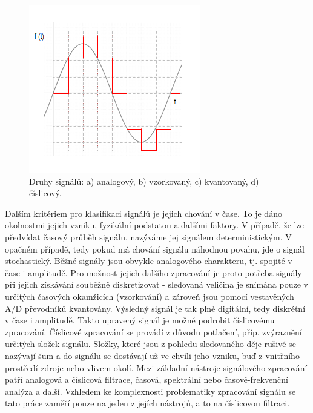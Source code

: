 \documentclass[a4paper, 12pt]{article}
\begin{document}
\begin{figure}[ht!]
\begin{minipage}[b]{5cm}
   \subcaption{}
\end{minipage}\hspace{1cm}
\begin{minipage}[b]{5cm}
  \centering
  \includegraphics[width=\linewidth]{číslicový.png}
  \subcaption{}
\end{minipage}
\caption{Druhy signálů: a) analogový, b) vzorkovaný, c) kvantovaný, d) číslicový.}
\label{fig:signal}
\end{figure}


Dalším kritériem pro klasifikaci signálů je jejich chování v čase. To je dáno okolnostmi jejich vzniku, fyzikální podstatou a dalšími faktory. V případě, že lze předvídat časový průběh signálu, nazýváme jej signálem deterministickým. V opačném případě, tedy pokud má chování signálu náhodnou povahu, jde o signál stochastický.
Běžné signály jsou obvykle analogového charakteru, tj. spojité v čase i amplitudě. Pro možnost jejich dalšího zpracování je proto potřeba signály při jejich získávání souběžně diskretizovat - sledovaná veličina je snímána pouze v určitých časových okamžicích (vzorkování) a zároveň jsou pomocí vestavěných A/D převodníků kvantovány. Výsledný signál je tak plně digitální, tedy diskrétní v čase i amplitudě. Takto upravený signál je možné podrobit číslicovému zpracování.
Číslicové zpracování se provádí z důvodu potlačení, příp. zvýraznění určitých složek signálu. Složky, které jsou z pohledu sledovaného děje rušivé se nazývají šum a do signálu se dostávají už ve chvíli jeho vzniku, buď z vnitřního prostředí zdroje nebo vlivem okolí. Mezi základní nástroje signálového zpracování patří
analogová a číslicová filtrace, časová, spektrální nebo časově-frekvenční analýza a další. Vzhledem ke komplexnosti problematiky zpracování signálu se tato práce zaměří pouze na jeden z jejích nástrojů, a to na číslicovou filtraci.
\end{document}
